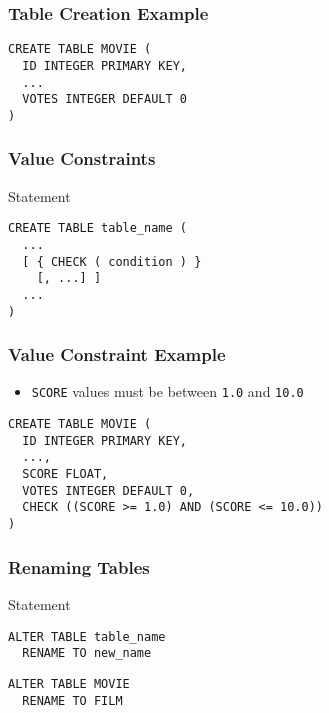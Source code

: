 \documentclass[dvipsnames]{beamer}
\theoremstyle{plain}
\begin{document}
\begin{frame}[fragile]
  \frametitle{Table Creation Example}

  \begin{example}
    \begin{lstlisting}
CREATE TABLE MOVIE (
  ID INTEGER PRIMARY KEY,
  ...
  VOTES INTEGER DEFAULT 0
)
    \end{lstlisting}
  \end{example}
\end{frame}

\begin{frame}[fragile]
  \frametitle{Value Constraints}

  \begin{block}{Statement}
    \begin{lstlisting}
CREATE TABLE table_name (
  ...
  [ { CHECK ( condition ) }
    [, ...] ]
  ...
)
    \end{lstlisting}
  \end{block}
\end{frame}

\begin{frame}[fragile]
  \frametitle{Value Constraint Example}

  \begin{example}
    \begin{itemize}
      \item \texttt{SCORE} values must be between \texttt{1.0} and \texttt{10.0}
    \end{itemize}

    \begin{lstlisting}
CREATE TABLE MOVIE (
  ID INTEGER PRIMARY KEY,
  ...,
  SCORE FLOAT,
  VOTES INTEGER DEFAULT 0,
  CHECK ((SCORE >= 1.0) AND (SCORE <= 10.0))
)
    \end{lstlisting}
  \end{example}
\end{frame}

\begin{frame}[fragile]
  \frametitle{Renaming Tables}

  \begin{block}{Statement}
    \begin{lstlisting}
ALTER TABLE table_name
  RENAME TO new_name
    \end{lstlisting}
  \end{block}

  \pause
  \medskip
  \begin{example}
    \begin{lstlisting}
ALTER TABLE MOVIE
  RENAME TO FILM
    \end{lstlisting}
  \end{example}
\end{frame}
\end{document}
